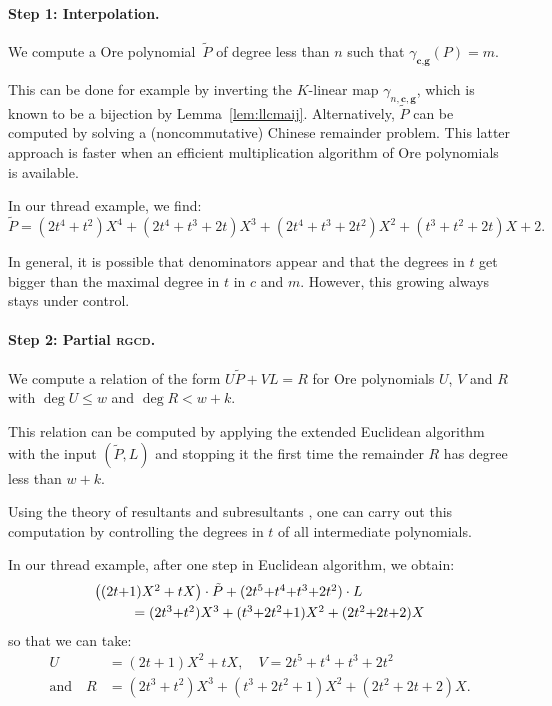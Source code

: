\documentclass[a4paper]{llncs}
\newcommand{\rgcd}{\textsc{rgcd}}
\newcommand{\bc}{\textbf{c}}
\newcommand{\bg}{\textbf{g}}
\begin{document}
\paragraph{Step 1: Interpolation.}

We compute a Ore polynomial~$\tilde P$ of degree less than $n$
such that $\gamma_{\bc,\bg}(P) = m$.

\noindent
This can be done for example by inverting the $K$-linear map 
$\gamma_{n,\bc,\bg}$, which is known to be a bijection by 
Lemma~\ref{lem:llcmaij}. Alternatively, $\tilde P$ can be
computed by solving a (noncommutative) Chinese remainder
problem. This latter approach is faster when an efficient
multiplication algorithm of Ore polynomials is available.

{\small
\begin{example}
In our thread example, we find:
$$\tilde P =
(2t^4{+}t^2) X^4 + (2t^4{+}t^3{+}2t) X^3 +
(2t^4{+}t^3{+}2t^2)X^2 + (t^3{+}t^2{+}2t) X + 2.$$
\end{example}}

\begin{remark}
In general, it is possible that denominators appear and
that the degrees in $t$ get bigger than the maximal degree
in $t$ in $c$ and $m$. However, this growing always stays
under control.
\end{remark}

\paragraph{Step 2: Partial \rgcd.}

We compute a relation of the form
$U \tilde P + V L = R$
for Ore polynomials $U$, $V$ and $R$ with $\deg U \leq w$ and
$\deg R < w+k$.

\noindent
This relation can be computed by applying the extended Euclidean 
algorithm with the input $(\tilde P, L)$ and stopping it the first
time the remainder $R$ has degree less than $w+k$.

\begin{remark}
Using the theory of resultants and subresultants \cite{li},
one can carry out this computation by controlling the degrees
in $t$ of all intermediate polynomials.
\end{remark}

{\small
\begin{example}
In our thread example, after one step in Euclidean algorithm,
we obtain:
$$\begin{array}{l}
  \big((2t{+}1)X^2 + tX\big) \cdot \tilde P 
+ (2t^5{+}t^4{+}t^3{+}2t^2) \cdot L \smallskip \\
\hspace{1cm}
= (2t^3{+}t^2) X^3 + (t^3{+}2t^2{+}1) X^2 + (2t^2{+}2t{+}2)X
\end{array}$$
so that we can take:
\begin{align*}
U & = (2t{+}1)X^2 + tX, \quad
V   = 2t^5{+}t^4{+}t^3{+}2t^2 \\
\text{and} \quad
R & = (2t^3{+}t^2) X^3 + (t^3{+}2t^2{+}1) X^2 + (2t^2{+}2t{+}2)X.
\end{align*}
\end{example}}
\end{document}
